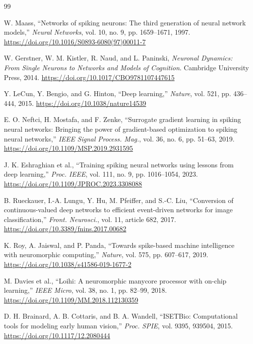 \documentclass[a4paper,10pt,twocolumn,uplatex,dvipdfmx]{jsarticle}
\begin{document}
\begin{thebibliography}{99}
\small

W. Maass,
``Networks of spiking neurons: The third generation of neural network models,''
\textit{Neural Networks}, vol. 10, no. 9, pp. 1659--1671, 1997.
\url{https://doi.org/10.1016/S0893-6080(97)00011-7}

W. Gerstner, W. M. Kistler, R. Naud, and L. Paninski,
\textit{Neuronal Dynamics: From Single Neurons to Networks and Models of Cognition}.
Cambridge University Press, 2014.
\url{https://doi.org/10.1017/CBO9781107447615}

Y. LeCun, Y. Bengio, and G. Hinton,
``Deep learning,''
\textit{Nature}, vol. 521, pp. 436--444, 2015.
\url{https://doi.org/10.1038/nature14539}

E. O. Neftci, H. Mostafa, and F. Zenke,
``Surrogate gradient learning in spiking neural networks:
Bringing the power of gradient-based optimization to spiking neural networks,''
\textit{IEEE Signal Process. Mag.}, vol. 36, no. 6, pp. 51--63, 2019.
\url{https://doi.org/10.1109/MSP.2019.2931595}

J. K. Eshraghian et al.,
``Training spiking neural networks using lessons from deep learning,''
\textit{Proc. IEEE}, vol. 111, no. 9, pp. 1016--1054, 2023.
\url{https://doi.org/10.1109/JPROC.2023.3308088}

B. Rueckauer, I.-A. Lungu, Y. Hu, M. Pfeiffer, and S.-C. Liu,
``Conversion of continuous-valued deep networks to efficient event-driven
networks for image classification,''
\textit{Front. Neurosci.}, vol. 11, article 682, 2017.
\url{https://doi.org/10.3389/fnins.2017.00682}

K. Roy, A. Jaiswal, and P. Panda,
``Towards spike-based machine intelligence with neuromorphic computing,''
\textit{Nature}, vol. 575, pp. 607--617, 2019.
\url{https://doi.org/10.1038/s41586-019-1677-2}

M. Davies et al.,
``Loihi: A neuromorphic manycore processor with on-chip learning,''
\textit{IEEE Micro}, vol. 38, no. 1, pp. 82--99, 2018.
\url{https://doi.org/10.1109/MM.2018.112130359}

D. H. Brainard, A. B. Cottaris, and B. A. Wandell,
``ISETBio: Computational tools for modeling early human vision,''
\textit{Proc. SPIE}, vol. 9395, 939504, 2015.
\url{https://doi.org/10.1117/12.2080444}


\end{thebibliography}
\end{document}
